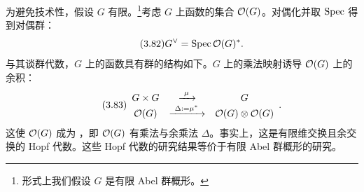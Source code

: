 为避免技术性，假设 $G$ 有限。\footnote{形式上我们假设 $G$ 是有限 Abel 群概形。}考虑 $G$ 上函数的集合 $\mathcal{O}(G)$。对偶化并取 $\mathrm{Spec}$ 得到对偶群：
\begin{equation}\tag{3.82}
G^{\vee}=\mathrm{Spec}\,\mathcal{O}(G)^{*}.
\end{equation}
与其谈群代数，$G$ 上的函数具有群的结构如下。$G$ 上的乘法映射诱导 $\mathcal{O}(G)$ 上的余积：
\begin{equation}\tag{3.83}
\begin{array}{ccc}
G\times G & \xrightarrow{\ \mu\ } & G\\
\mathcal{O}(G) & \xrightarrow{\ \Delta:=\mu^{*}\ } & \mathcal{O}(G)\otimes\mathcal{O}(G)
\end{array}.
\end{equation}
这使 $\mathcal{O}(G)$ 成为 ，即 $\mathcal{O}(G)$ 有乘法与余乘法 $\Delta$。事实上，这是有限维交换且余交换的 Hopf 代数。这些 Hopf 代数的研究结果等价于有限 Abel 群概形的研究。

